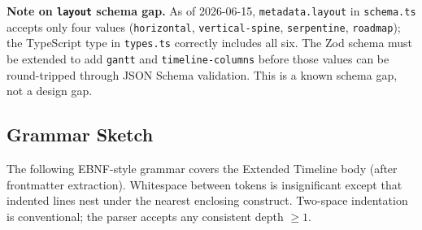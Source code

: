 \noindent
\textbf{Note on \texttt{layout} schema gap.}  As of 2026-06-15,
\texttt{metadata.layout} in \texttt{schema.ts} accepts only four values
(\texttt{horizontal}, \texttt{vertical-spine}, \texttt{serpentine},
\texttt{roadmap}); the TypeScript type in \texttt{types.ts} correctly
includes all six.  The Zod schema must be extended to add \texttt{gantt} and
\texttt{timeline-columns} before those values can be round-tripped through
JSON Schema validation.  This is a known schema gap, not a design gap.

\subsection{Grammar Sketch}
\label{sec:et-grammar}

The following EBNF-style grammar covers the Extended Timeline body (after
frontmatter extraction).  Whitespace between tokens is insignificant except
that indented lines nest under the nearest enclosing construct.  Two-space
indentation is conventional; the parser accepts any consistent depth $\ge
1$.

